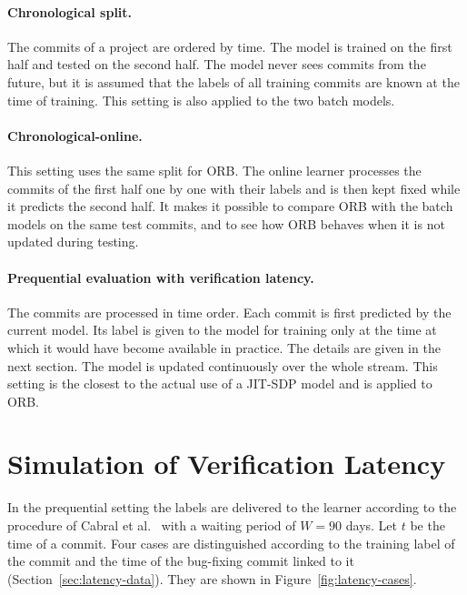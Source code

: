 \documentclass[12pt,a4paper,oneside]{report}
\begin{document}
\paragraph{Chronological split.} The commits of a project are ordered by
time. The model is trained on the first half and tested on the second half.
The model never sees commits from the future, but it is assumed that the
labels of all training commits are known at the time of training. This
setting is also applied to the two batch models.

\paragraph{Chronological-online.} This setting uses the same split for ORB.
The online learner processes the commits of the first half one by one with
their labels and is then kept fixed while it predicts the second half. It
makes it possible to compare ORB with the batch models on the same test
commits, and to see how ORB behaves when it is not updated during testing.

\paragraph{Prequential evaluation with verification latency.} The commits are
processed in time order. Each commit is first predicted by the current model.
Its label is given to the model for training only at the time at which it
would have become available in practice. The details are given in the next
section. The model is updated continuously over the whole stream. This
setting is the closest to the actual use of a JIT-SDP model and is applied to
ORB.

\section{Simulation of Verification Latency}\label{sec:latency-method}

In the prequential setting the labels are delivered to the learner according
to the procedure of Cabral et al.~\cite{cabral2019orb} with a waiting period
of $W = 90$ days. Let $t$ be the time of a commit. Four cases are
distinguished according to the training label of the commit and the time of
the bug-fixing commit linked to it (Section~\ref{sec:latency-data}). They are
shown in Figure~\ref{fig:latency-cases}.
\end{document}
